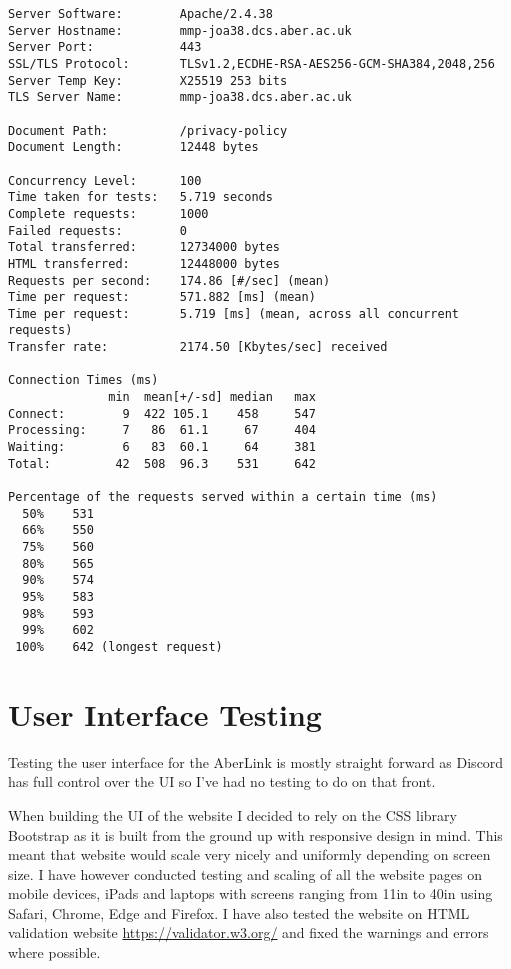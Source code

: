 \begin{verbatim}
Server Software:        Apache/2.4.38
Server Hostname:        mmp-joa38.dcs.aber.ac.uk
Server Port:            443
SSL/TLS Protocol:       TLSv1.2,ECDHE-RSA-AES256-GCM-SHA384,2048,256
Server Temp Key:        X25519 253 bits
TLS Server Name:        mmp-joa38.dcs.aber.ac.uk

Document Path:          /privacy-policy
Document Length:        12448 bytes

Concurrency Level:      100
Time taken for tests:   5.719 seconds
Complete requests:      1000
Failed requests:        0
Total transferred:      12734000 bytes
HTML transferred:       12448000 bytes
Requests per second:    174.86 [#/sec] (mean)
Time per request:       571.882 [ms] (mean)
Time per request:       5.719 [ms] (mean, across all concurrent requests)
Transfer rate:          2174.50 [Kbytes/sec] received

Connection Times (ms)
              min  mean[+/-sd] median   max
Connect:        9  422 105.1    458     547
Processing:     7   86  61.1     67     404
Waiting:        6   83  60.1     64     381
Total:         42  508  96.3    531     642

Percentage of the requests served within a certain time (ms)
  50%    531
  66%    550
  75%    560
  80%    565
  90%    574
  95%    583
  98%    593
  99%    602
 100%    642 (longest request)
\end{verbatim}

\section{User Interface Testing}
Testing the user interface for the AberLink is mostly straight forward as Discord has full control over the UI so I've had no testing to do on that front.

When building the UI of the website I decided to rely on the CSS library Bootstrap \cite{bootstrap} as it is built from the ground up with responsive design in mind. This meant that website would scale very nicely and uniformly depending on screen size. I have however conducted testing and scaling of all the website pages on mobile devices, iPads and laptops with screens ranging from 11in to 40in using Safari, Chrome, Edge and Firefox. I have also tested the website on HTML validation website \href{https://validator.w3.org/}{https://validator.w3.org/} and fixed the warnings and errors where possible.

